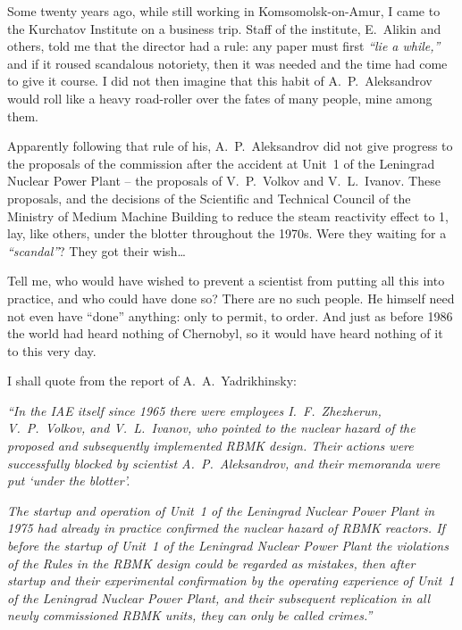 \documentclass[openright]{bookest}
\begin{document}
Some twenty years ago, while still working in Komsomolsk-on-Amur, I came to the Kurchatov Institute on a business trip. Staff of the institute, E.~Alikin and others, told me that the director had a rule: any paper must first \textit{``lie a while,''} and if it roused scandalous notoriety, then it was needed and the time had come to give it course. I did not then imagine that this habit of A.~P.~Aleksandrov would roll like a heavy road-roller over the fates of many people, mine among them.

Apparently following that rule of his, A.~P.~Aleksandrov did not give progress to the proposals of the commission after the accident at Unit~1 of the Leningrad Nuclear Power Plant -- the proposals of V.~P.~Volkov and V.~L.~Ivanov. These proposals, and the decisions of the Scientific and Technical Council of the Ministry of Medium Machine Building to reduce the steam reactivity effect to \qty{1}{\beta}, lay, like others, under the blotter throughout the 1970s. Were they waiting for a \textit{``scandal''}? They got their wish\ldots

Tell me, who would have wished to prevent a scientist from putting all this into practice, and who could have done so? There are no such people. He himself need not even have ``done'' anything: only to permit, to order. And just as before 1986 the world had heard nothing of Chernobyl, so it would have heard nothing of it to this very day.

I shall quote from the report of A.~A.~Yadrikhinsky:

\begin{personal}
\textit{``In the IAE itself since 1965 there were employees I.~F.~Zhezherun, V.~P.~Volkov, and V.~L.~Ivanov, who pointed to the nuclear hazard of the proposed and subsequently implemented RBMK design. Their actions were successfully blocked by scientist A.~P.~Aleksandrov, and their memoranda were put `under the blotter'.}

\textit{The startup and operation of Unit~1 of the Leningrad Nuclear Power Plant in 1975 had already in practice confirmed the nuclear hazard of RBMK reactors. If before the startup of Unit~1 of the Leningrad Nuclear Power Plant the violations of the Rules in the RBMK design could be regarded as mistakes, then after startup and their experimental confirmation by the operating experience of Unit~1 of the Leningrad Nuclear Power Plant, and their subsequent replication in all newly commissioned RBMK units, they can only be called crimes.''}
\end{personal}
\end{document}
